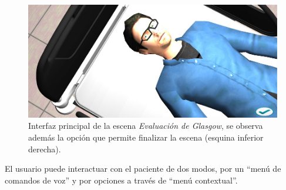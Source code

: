 \begin{figure}[H]
\centering
\includegraphics[scale=0.5]{solucion/images/glasgow_principal.jpg}
\caption{Interfaz principal de la escena \emph{Evaluación de Glasgow}, se observa además
    la opción que permite finalizar la escena
    (esquina inferior derecha).}
\label{fig:glasgow_principal}
\end{figure}

El usuario puede interactuar con el paciente de dos modos, por un 
\enquote{menú de comandos de voz} y por opciones a través de \enquote{menú contextual}. 

